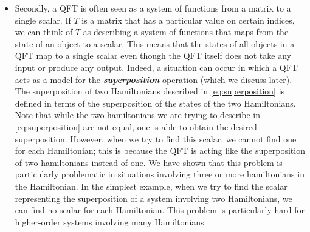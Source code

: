 \documentclass[a4paper,reqno,oneside]{article}
\begin{document}
\begin{itemize}
    \item Secondly, a QFT is often seen as a system of functions from a matrix to a single scalar. If $T$ is a matrix that has a particular value on certain indices, we can think of $T$ as describing a system of functions that maps from the state of an object to a scalar. This means that the states of all objects in a QFT map to a single scalar even though the QFT itself does not take any input or produce any output. Indeed, a situation can occur in which a QFT acts as a model for the \textbf{\textit{superposition}} operation \cite{Kapranov:2020} (which we discuss later). The superposition of two Hamiltonians described in \eqref{eq:superposition} is defined in terms of the superposition of the states of the two Hamiltonians. Note that while the two hamiltonians we are trying to describe in \eqref{eq:superposition} are not equal, one is able to obtain the desired superposition. However, when we try to find this scalar, we cannot find one for each Hamiltonian; this is because the QFT is acting like the superposition of two hamiltonians instead of one. We have shown that this problem is particularly problematic in situations involving three or more hamiltonians in the Hamiltonian. In the simplest example, when we try to find the scalar representing the superposition of a system involving two Hamiltonians, we can find no scalar for each Hamiltonian. This problem is particularly hard for higher-order systems involving many Hamiltonians. 
\end{itemize} 
\end{document}
